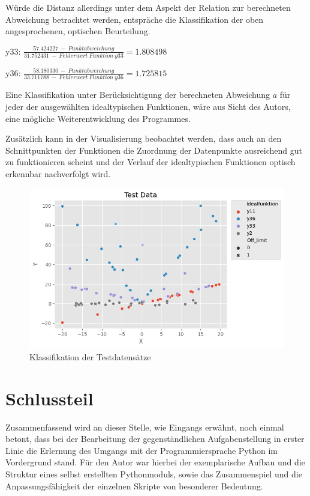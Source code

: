 Würde die Distanz allerdings unter dem Aspekt der Relation zur berechneten Abweichung betrachtet werden, entspräche die Klassifikation der oben angesprochenen, optischen Beurteilung. 

y33: $ \frac{57.424227\ -\ Punktabweichung}{31.752431\ -\ Fehlerwert\ Funktion\ y33} = 1.808498 $ 

y36: $ \frac{58.180330\ -\ Punktabweichung}{33.711788\ -\ Fehlerwert\ Funktion\ y36} = 1.725815 $

Eine Klassifikation unter Berücksichtigung der berechneten Abweichung $a$ für jeder der ausgewählten idealtypischen Funktionen, wäre aus Sicht des Autors, eine mögliche Weiterentwicklung des Programmes.

Zusätzlich kann in der Visualisierung beobachtet werden, dass auch an den Schnittpunkten der Funktionen die Zuordnung der Datenpunkte ausreichend gut zu funktionieren scheint und der Verlauf der idealtypischen Funktionen optisch erkennbar nachverfolgt wird.

\begin{figure}[h]
\centering
\includegraphics[width=13cm]{../output/figures/test.png}
\caption{Klassifikation der Testdatensätze \cite{Gage:18}}\label{fig:test}
\end{figure}


\chapter{Schlussteil}

Zusammenfassend wird an dieser Stelle, wie Eingangs erwähnt, noch einmal betont, dass bei der Bearbeitung der gegenständlichen Aufgabenstellung in erster Linie die Erlernung des Umgangs mit der Programmiersprache Python im Vordergrund stand. Für den Autor war hierbei der exemplarische Aufbau und die Struktur eines selbst erstellten Pythonmoduls, sowie das Zusammenspiel und die Anpassungsfähigkeit der einzelnen Skripte von besonderer Bedeutung.

